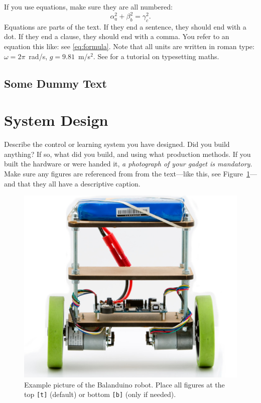 \documentclass{LTHtwocol} %
\begin{document}
If you use equations, make sure they are all numbered:
\begin{equation}
\alpha_a^2 + \beta_b^2 = \gamma_c^2.
\label{eq:formula}
\end{equation}
Equations are parts of the text. If they end a sentence, they should end with a dot. If they end a clause, they should end with a comma. You refer to an equation this like: see \eqref{eq:formula}. Note that all units are written in roman type: $\omega=2\pi$~rad/s, $g = 9.81$~m/s$^2$. See \cite{mathslatexwiki} for a tutorial on typesetting maths.

\subsection{Some Dummy Text}
\kant[2]

\section{System Design}
Describe the control or learning system you have designed.
Did you build anything? If so, what did you build, and using what production methods. If you built the hardware or were handed it, \emph{a photograph of your gadget is mandatory}. Make sure any figures are referenced from from the text---like this, see Figure~\ref{fig:gadget}---and that they all have a descriptive caption.
\begin{figure}[b]
	\centering
	\includegraphics[width=0.7\columnwidth]{balanduino}
	\caption{Example picture of the Balanduino robot. Place all figures at the top \texttt{[t]} (default) or bottom \texttt{[b]} (only if needed).}
	\label{fig:gadget} %
\end{figure}
\end{document}
